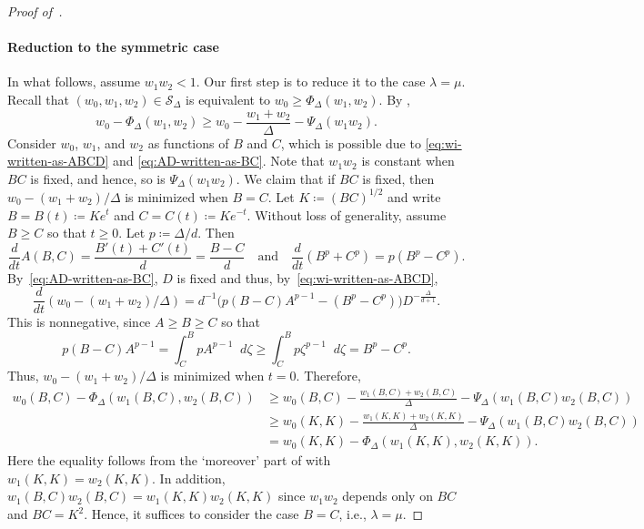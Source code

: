 \documentclass{article}
\numberwithin{equation}{section}
\theoremstyle{plain}
\theoremstyle{definition}
\theoremstyle{remark} %
\newcommand{\defeq}{\coloneqq}
\newcommand{\calS}{\mathcal{S}}
\newcommand{\diff}{\mathop{}\!d} %
\begin{document}
\begin{proof}[Proof of~]
\paragraph{Reduction to the symmetric case}
In what follows, assume \(w_1w_2<1\). Our first step is to reduce it to the case \(\lambda=\mu\).
Recall that \((w_0,w_1,w_2)\in\calS_\Delta\) is equivalent to \(w_0\ge \Phi_\Delta(w_1,w_2)\). By ,
\[
    w_0 - \Phi_\Delta(w_1,w_2)
    \ge w_0 - \frac{w_1+w_2}{\Delta} - \Psi_\Delta(w_1w_2).
\]
Consider \(w_0\), \(w_1\), and \(w_2\) as functions of \(B\) and \(C\), which is possible due to \eqref{eq:wi-written-as-ABCD} and \eqref{eq:AD-written-as-BC}. Note that \(w_1w_2\) is constant when \(BC\) is fixed, and hence, so is \(\Psi_\Delta(w_1w_2)\). We claim that if \(BC\) is fixed, then \(w_0 - (w_1+w_2)/\Delta\) is minimized when \(B=C\). Let \(K\defeq (BC)^{1/2}\) and write \(B=B(t)\defeq K e^t\) and \(C=C(t)\defeq K e^{-t}\). Without loss of generality, assume \(B\ge C\) so that \(t\ge0\). Let \(p\defeq \Delta/d\). Then
\[
    \frac{d}{dt} A(B,C)= \frac{B'(t) + C'(t)}{d} = \frac{B-C}{d}
    \quad\text{and}\quad
    \frac{d}{dt} (B^{p} + C^{p}) 	= p (B^p - C^p).
\]
By~\eqref{eq:AD-written-as-BC}, $D$ is fixed and thus, by~\eqref{eq:wi-written-as-ABCD},
\[
	\frac{d}{dt} (w_0-(w_1+w_2)/\Delta) = d^{-1} \bigl( p (B-C) A^{p-1} - (B^p - C^p) \bigr) D^{-\frac{\Delta}{d+1}}.
\]
This is nonnegative, since \(A\ge B\ge C\) so that
\[
	p(B-C)A^{p-1}=\int_C^B pA^{p-1} \diff\zeta
	\geq \int_C^B p\zeta^{p-1} \diff\zeta = B^p-C^p.
\]
Thus, \(w_0-(w_1+w_2)/\Delta\) is minimized when \(t=0\). Therefore,
\begin{align*}
    w_0(B,C) - \Phi_\Delta(w_1(B,C), w_2(B,C))
    &\ge w_0(B,C) - \frac{w_1(B,C)+w_2(B,C)}{\Delta} - \Psi_\Delta(w_1(B,C)w_2(B,C))
    \\&\ge w_0(K,K) - \frac{w_1(K,K)+w_2(K,K)}{\Delta} - \Psi_\Delta(w_1(B,C)w_2(B,C))
    \\&= w_0(K,K) - \Phi_\Delta(w_1(K,K), w_2(K,K)).
\end{align*}
Here the equality follows from the `moreover' part of  with \(w_1(K,K) = w_2(K,K)\). In addition, \(w_1(B,C)w_2(B,C) = w_1(K,K)w_2(K,K)\) since \(w_1w_2\) depends only on \(BC\) and \(BC = K^2\). Hence, it suffices to consider the case \(B=C\), i.e., \(\lambda=\mu\).



\end{proof}
\end{document}
